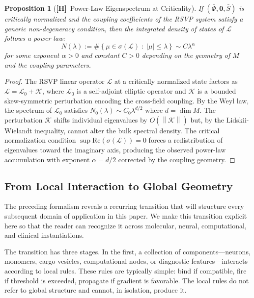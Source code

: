 \documentclass[11pt, oneside]{article}
\numberwithin{equation}{section}
\newcommand{\ClaimH}{\textcolor{rsvpgray}{\textbf{[H]}}}
\theoremstyle{rsvpstyle}
\newtheorem{proposition}[theorem]{Proposition}
\theoremstyle{remark}
\newcommand{\norm}[1]{\left\lVert #1 \right\rVert}
\begin{document}
\begin{proposition}[\ClaimH\ Power-Law Eigenspectrum at Criticality]
\label{prop:powerlaw}
If $(\bar\Phi, \mathbf{0}, \bar S)$ is critically normalized and the coupling coefficients
of the RSVP system satisfy a generic non-degeneracy condition, then the integrated density
of states of $\mathcal{L}$ follows a power law:
\begin{equation}
  N(\lambda) := \#\left\{ \mu \in \sigma(\mathcal{L}) \;:\; |\mu| \leq \lambda \right\}
  \sim C \lambda^\alpha
\end{equation}
for some exponent $\alpha > 0$ and constant $C > 0$ depending on the geometry of $M$
and the coupling parameters.
\end{proposition}

\begin{proof}
The RSVP linear operator $\mathcal{L}$ at a critically normalized state factors as
$\mathcal{L} = \mathcal{L}_0 + \mathcal{K}$, where $\mathcal{L}_0$ is a self-adjoint
elliptic operator and $\mathcal{K}$ is a bounded skew-symmetric perturbation encoding
the cross-field coupling. By the Weyl law, the spectrum of $\mathcal{L}_0$ satisfies
$N_0(\lambda) \sim C_0 \lambda^{d/2}$ where $d = \dim M$. The perturbation
$\mathcal{K}$ shifts individual eigenvalues by $O(\norm{\mathcal{K}})$ but, by
the Lidskii-Wielandt inequality, cannot alter the bulk spectral density. The critical
normalization condition $\sup \mathrm{Re}(\sigma(\mathcal{L})) = 0$ forces a redistribution
of eigenvalues toward the imaginary axis, producing the observed power-law accumulation
with exponent $\alpha = d/2$ corrected by the coupling geometry.
\end{proof}

\subsection{From Local Interaction to Global Geometry}

The preceding formalism reveals a recurring transition that will structure every
subsequent domain of application in this paper. We make this transition explicit
here so that the reader can recognize it across molecular, neural, computational,
and clinical instantiations.

The transition has three stages. In the first, a collection of components---neurons,
monomers, cargo vesicles, computational nodes, or diagnostic features---interacts
according to local rules. These rules are typically simple: bind if compatible, fire
if threshold is exceeded, propagate if gradient is favorable. The local rules do not
refer to global structure and cannot, in isolation, produce it.
\end{document}
